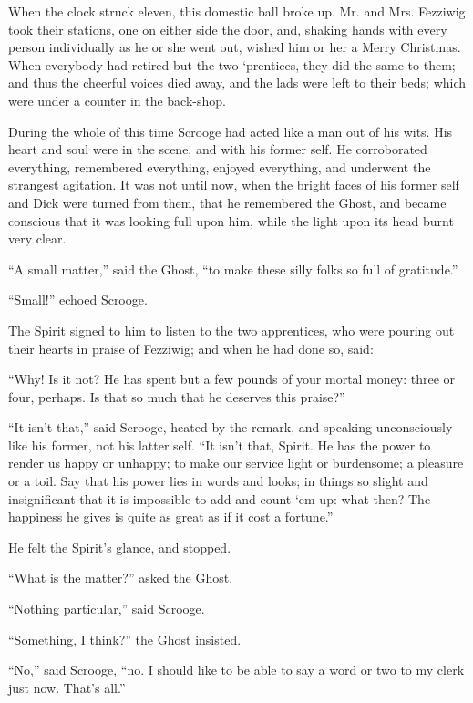 \documentclass[paper=5.5in:8.5in,BCOR=15mm,twoside,DIV=15,headinclude=off,12pt,chapterprefix=off,openany,headings=huge]{scrbook} %
\begin{document}
When the clock struck eleven, this domestic ball broke up. Mr. and Mrs. Fezziwig took their stations, one on either side the door, and, shaking hands with every person individually as he or she went out, wished him or her a Merry Christmas. When everybody had retired but the two `prentices, they did the same to them; and thus the cheerful voices died away, and the lads were left to their beds; which were under a counter in the back-shop.

During the whole of this time Scrooge had acted like a man out of his wits. His heart and soul were in the scene, and with his former self. He corroborated everything, remembered everything, enjoyed everything, and underwent the strangest agitation. It was not until now, when the bright faces of his former self and Dick were turned from them, that he remembered the Ghost, and became conscious that it was looking full upon him, while the light upon its head burnt very clear.

\enquote{A small matter,} said the Ghost, \enquote{to make these silly folks so full of gratitude.}

\enquote{Small!} echoed Scrooge.

The Spirit signed to him to listen to the two apprentices, who were pouring out their hearts in praise of Fezziwig; and when he had done so, said:

\enquote{Why! Is it not? He has spent but a few pounds of your mortal money: three or four, perhaps. Is that so much that he deserves this praise?}

\enquote{It isn't that,} said Scrooge, heated by the remark, and speaking unconsciously like his former, not his latter self. \enquote{It isn't that, Spirit. He has the power to render us happy or unhappy; to make our service light or burdensome; a pleasure or a toil. Say that his power lies in words and looks; in things so slight and insignificant that it is impossible to add and count `em up: what then? The happiness he gives is quite as great as if it cost a fortune.}

He felt the Spirit's glance, and stopped.

\enquote{What is the matter?} asked the Ghost.

\enquote{Nothing particular,} said Scrooge.

\enquote{Something, I think?} the Ghost insisted.

\enquote{No,} said Scrooge, \enquote{no. I should like to be able to say a word or two to my clerk just now. That's all.}
\end{document}
